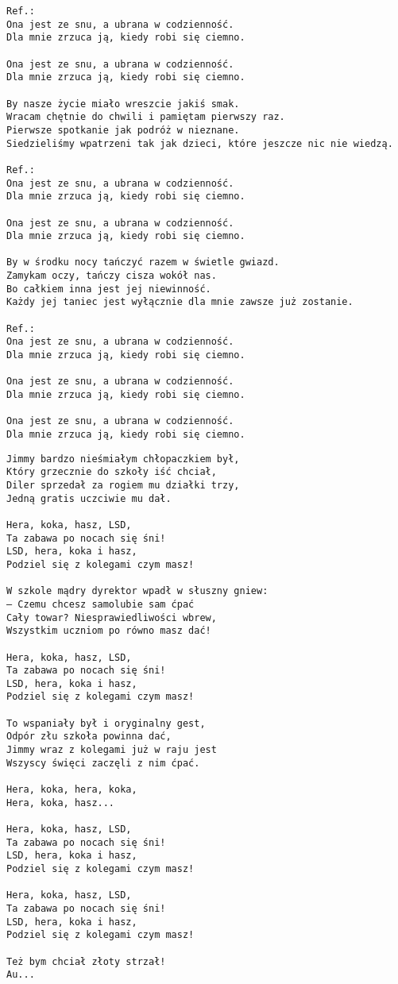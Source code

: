 \documentclass[12pt]{article}
\begin{document}
\begin{verbatim}
Ref.:
Ona jest ze snu, a ubrana w codzienność.
Dla mnie zrzuca ją, kiedy robi się ciemno.

Ona jest ze snu, a ubrana w codzienność.
Dla mnie zrzuca ją, kiedy robi się ciemno.

By nasze życie miało wreszcie jakiś smak.
Wracam chętnie do chwili i pamiętam pierwszy raz.
Pierwsze spotkanie jak podróż w nieznane.
Siedzieliśmy wpatrzeni tak jak dzieci, które jeszcze nic nie wiedzą.

Ref.:
Ona jest ze snu, a ubrana w codzienność.
Dla mnie zrzuca ją, kiedy robi się ciemno.

Ona jest ze snu, a ubrana w codzienność.
Dla mnie zrzuca ją, kiedy robi się ciemno.

By w środku nocy tańczyć razem w świetle gwiazd.
Zamykam oczy, tańczy cisza wokół nas.
Bo całkiem inna jest jej niewinność.
Każdy jej taniec jest wyłącznie dla mnie zawsze już zostanie.

Ref.:
Ona jest ze snu, a ubrana w codzienność.
Dla mnie zrzuca ją, kiedy robi się ciemno.

Ona jest ze snu, a ubrana w codzienność.
Dla mnie zrzuca ją, kiedy robi się ciemno.

Ona jest ze snu, a ubrana w codzienność.
Dla mnie zrzuca ją, kiedy robi się ciemno.
\end{verbatim}
\clearpage

\begin{verbatim}
Jimmy bardzo nieśmiałym chłopaczkiem był,
Który grzecznie do szkoły iść chciał,
Diler sprzedał za rogiem mu działki trzy,
Jedną gratis uczciwie mu dał.

Hera, koka, hasz, LSD,
Ta zabawa po nocach się śni!
LSD, hera, koka i hasz,
Podziel się z kolegami czym masz!

W szkole mądry dyrektor wpadł w słuszny gniew:
– Czemu chcesz samolubie sam ćpać
Cały towar? Niesprawiedliwości wbrew,
Wszystkim uczniom po równo masz dać!

Hera, koka, hasz, LSD,
Ta zabawa po nocach się śni!
LSD, hera, koka i hasz,
Podziel się z kolegami czym masz!

To wspaniały był i oryginalny gest,
Odpór złu szkoła powinna dać,
Jimmy wraz z kolegami już w raju jest
Wszyscy święci zaczęli z nim ćpać.

Hera, koka, hera, koka,
Hera, koka, hasz...

Hera, koka, hasz, LSD,
Ta zabawa po nocach się śni!
LSD, hera, koka i hasz,
Podziel się z kolegami czym masz!

Hera, koka, hasz, LSD,
Ta zabawa po nocach się śni!
LSD, hera, koka i hasz,
Podziel się z kolegami czym masz!

Też bym chciał złoty strzał!
Au...
\end{verbatim}
\clearpage
\end{document}
